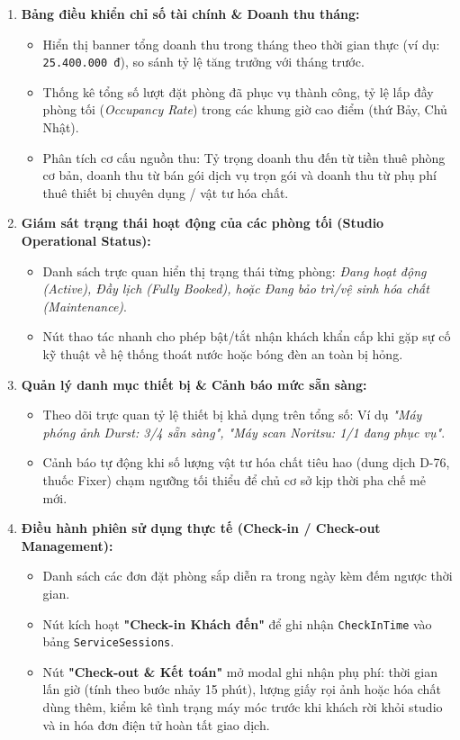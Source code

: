 \begin{enumerate}[leftmargin=2em]
    \item \textbf{Bảng điều khiển chỉ số tài chính \& Doanh thu tháng:}
    \begin{itemize}
        \item Hiển thị banner tổng doanh thu trong tháng theo thời gian thực (ví dụ: \texttt{25.400.000 đ}), so sánh tỷ lệ tăng trưởng với tháng trước.
        \item Thống kê tổng số lượt đặt phòng đã phục vụ thành công, tỷ lệ lấp đầy phòng tối (\textit{Occupancy Rate}) trong các khung giờ cao điểm (thứ Bảy, Chủ Nhật).
        \item Phân tích cơ cấu nguồn thu: Tỷ trọng doanh thu đến từ tiền thuê phòng cơ bản, doanh thu từ bán gói dịch vụ trọn gói và doanh thu từ phụ phí thuê thiết bị chuyên dụng / vật tư hóa chất.
    \end{itemize}

    \item \textbf{Giám sát trạng thái hoạt động của các phòng tối (Studio Operational Status):}
    \begin{itemize}
        \item Danh sách trực quan hiển thị trạng thái từng phòng: \textit{Đang hoạt động (Active), Đầy lịch (Fully Booked), hoặc Đang bảo trì/vệ sinh hóa chất (Maintenance)}.
        \item Nút thao tác nhanh cho phép bật/tắt nhận khách khẩn cấp khi gặp sự cố kỹ thuật về hệ thống thoát nước hoặc bóng đèn an toàn bị hỏng.
    \end{itemize}

    \item \textbf{Quản lý danh mục thiết bị \& Cảnh báo mức sẵn sàng:}
    \begin{itemize}
        \item Theo dõi trực quan tỷ lệ thiết bị khả dụng trên tổng số: Ví dụ \textit{"Máy phóng ảnh Durst: 3/4 sẵn sàng", "Máy scan Noritsu: 1/1 đang phục vụ"}.
        \item Cảnh báo tự động khi số lượng vật tư hóa chất tiêu hao (dung dịch D-76, thuốc Fixer) chạm ngưỡng tối thiểu để chủ cơ sở kịp thời pha chế mẻ mới.
    \end{itemize}

    \item \textbf{Điều hành phiên sử dụng thực tế (Check-in / Check-out Management):}
    \begin{itemize}
        \item Danh sách các đơn đặt phòng sắp diễn ra trong ngày kèm đếm ngược thời gian.
        \item Nút kích hoạt \textbf{"Check-in Khách đến"} để ghi nhận \texttt{CheckInTime} vào bảng \texttt{ServiceSessions}.
        \item Nút \textbf{"Check-out \& Kết toán"} mở modal ghi nhận phụ phí: thời gian lấn giờ (tính theo bước nhảy 15 phút), lượng giấy rọi ảnh hoặc hóa chất dùng thêm, kiểm kê tình trạng máy móc trước khi khách rời khỏi studio và in hóa đơn điện tử hoàn tất giao dịch.
    \end{itemize}
\end{enumerate}
